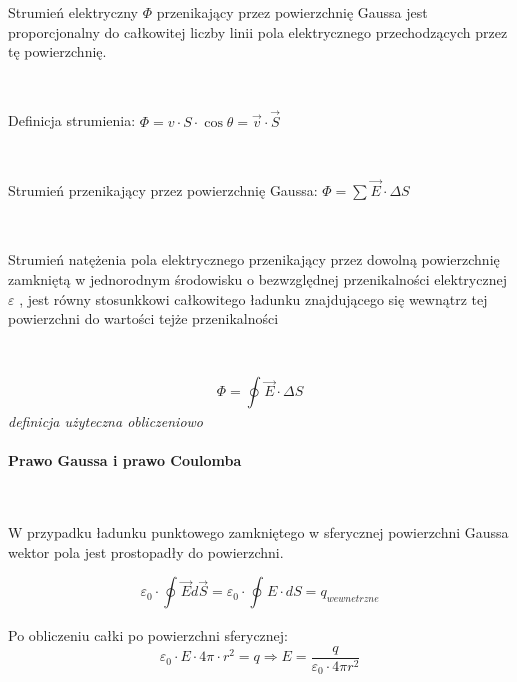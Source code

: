 \documentclass{article}
\begin{document}
            Strumień elektryczny $\Phi$ przenikający przez powierzchnię
            Gaussa jest proporcjonalny do całkowitej liczby linii pola
            elektrycznego przechodzących przez tę powierzchnię.

            \

            Definicja strumienia:
            $\Phi = v\cdotp S \cdotp \cos\theta = \vec{v} \cdotp 
            \vec{S}$

            \
            
            Strumień przenikający przez powierzchnię Gaussa:
            $\Phi = \sum\nolimits_{}\vec{E} \cdotp \Delta S$

            \

            Strumień natężenia pola elektrycznego przenikający przez
            dowolną powierzchnię zamkniętą w jednorodnym środowisku
            o bezwzględnej przenikalności elektrycznej $\varepsilon$
            , jest równy stosunkkowi całkowitego ładunku znajdującego
            się wewnątrz tej powierzchni do wartości tejże przenikalności
            
            \
            
            \begin{equation}
                \Phi = \oint\nolimits_{} \vec{E}\cdotp\Delta S
            \end{equation}
            \textit{definicja użyteczna obliczeniowo}
            
            \paragraph{Prawo Gaussa i prawo Coulomba} 
            \

            W przypadku ładunku
            punktowego zamkniętego w sferycznej powierzchni
            Gaussa wektor pola jest prostopadły do powierzchni.

            \begin{equation}
                \varepsilon_0 \cdotp \oint\nolimits_{} \vec{E} d\vec{S}
                = \varepsilon_0 \cdotp \oint\nolimits_{} E \cdotp dS
                = q_{wewnetrzne}    
            \end{equation}

            Po obliczeniu całki po powierzchni sferycznej:
            \begin{equation}
                \varepsilon_0 \cdotp E \cdotp 4\pi \cdotp r^2 = q
                \Longrightarrow
                E = \frac{q}{\varepsilon_0 \cdotp 4 \pi r^2}
            \end{equation}
\end{document}
